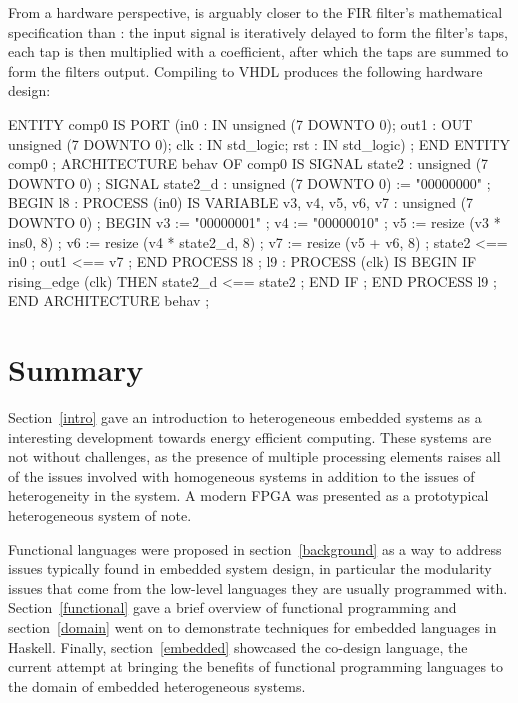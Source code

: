 \documentclass[../paper.tex]{subfiles}
\begin{document}
From a hardware perspective,  is arguably closer to the FIR filter's mathematical specification than : the input signal is iteratively delayed to form the filter's taps, each tap is then multiplied with a coefficient, after which the taps are summed to form the filters output. Compiling  to VHDL produces the following hardware design:

\begin{code}
ENTITY comp0 IS
  PORT (in0 : IN unsigned (7 DOWNTO 0);
        out1 : OUT unsigned (7 DOWNTO 0);
        clk : IN std_logic;
        rst : IN std_logic) ;
END ENTITY comp0 ;
ARCHITECTURE behav OF comp0 IS
  SIGNAL state2 : unsigned (7 DOWNTO 0) ;
  SIGNAL state2_d : unsigned (7 DOWNTO 0) := "00000000" ;
BEGIN
  l8 :
    PROCESS (in0) IS
      VARIABLE v3, v4, v5, v6, v7 : unsigned (7 DOWNTO 0) ; 
    BEGIN
      v3 := "00000001" ;
      v4 := "00000010" ;
      v5 := resize (v3 * ins0, 8) ;
      v6 := resize (v4 * state2_d, 8) ;
      v7 := resize (v5 + v6, 8) ;
      state2 <== in0 ;
      out1 <== v7 ;
    END PROCESS l8 ;
  l9 :
    PROCESS (clk) IS
    BEGIN
      IF rising_edge (clk) THEN
        state2_d <== state2 ;
      END IF ;
    END PROCESS l9 ;
END ARCHITECTURE behav ;
\end{code}

\section{Summary}

Section~\ref{intro} gave an introduction to heterogeneous embedded systems as a interesting development towards energy efficient computing. These systems are not without challenges, as the presence of multiple processing elements raises all of the issues involved with homogeneous systems in addition to the issues of heterogeneity in the system. A modern FPGA was presented as a prototypical heterogeneous system of note.

Functional languages were proposed in section~\ref{background} as a way to address issues typically found in embedded system design, in particular the modularity issues that come from the low-level languages they are usually programmed with. Section~\ref{functional} gave a brief overview of functional programming and section~\ref{domain} went on to demonstrate techniques for embedded languages in Haskell. Finally, section~\ref{embedded} showcased the co-design language, the current attempt at bringing the benefits of functional programming languages to the domain of embedded heterogeneous systems.
\end{document}

